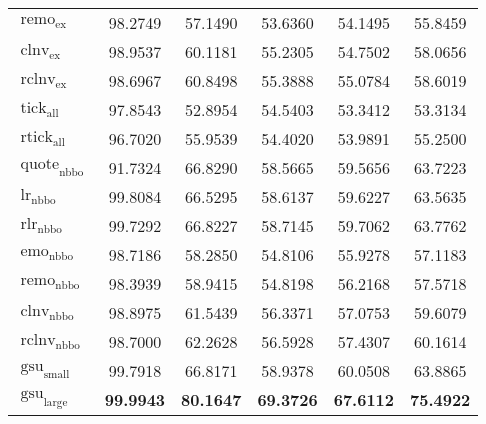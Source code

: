 \begin{table}[ht]
\begin{tabular}{@{}lSSSSS@{}}
        $\operatorname{remo}_{\mathrm{ex}}$    & 98.2749           & 57.1490                            & 53.6360           & 54.1495           & 55.8459           \\
        $\operatorname{clnv}_{\mathrm{ex}}$    & 98.9537           & 60.1181                            & 55.2305           & 54.7502           & 58.0656           \\
        $\operatorname{rclnv}_{\mathrm{ex}}$   & 98.6967           & 60.8498                            & 55.3888           & 55.0784           & 58.6019           \\ \midrule
        $\operatorname{tick}_{\mathrm{all}}$   & 97.8543           & 52.8954                            & 54.5403           & 53.3412           & 53.3134           \\
        $\operatorname{rtick}_{\mathrm{all}}$  & 96.7020           & 55.9539                            & 54.4020           & 53.9891           & 55.2500           \\ \midrule
        $\operatorname{quote}_{\mathrm{nbbo}}$ & 91.7324           & 66.8290                            & 58.5665           & 59.5656           & 63.7223           \\
        $\operatorname{lr}_{\mathrm{nbbo}}$    & 99.8084           & 66.5295                            & 58.6137           & 59.6227           & 63.5635           \\
        $\operatorname{rlr}_{\mathrm{nbbo}}$   & 99.7292           & 66.8227                            & 58.7145           & 59.7062           & 63.7762           \\
        $\operatorname{emo}_{\mathrm{nbbo}}$   & 98.7186           & 58.2850                            & 54.8106           & 55.9278           & 57.1183           \\
        $\operatorname{remo}_{\mathrm{nbbo}}$  & 98.3939           & 58.9415                            & 54.8198           & 56.2168           & 57.5718           \\
        $\operatorname{clnv}_{\mathrm{nbbo}}$  & 98.8975           & 61.5439                            & 56.3371           & 57.0753           & 59.6079           \\
        $\operatorname{rclnv}_{\mathrm{nbbo}}$ & 98.7000           & 62.2628                            & 56.5928           & 57.4307           & 60.1614           \\ \midrule
        $\operatorname{gsu}_{\mathrm{small}}$  & 99.7918           & 66.8171                            & 58.9378           & 60.0508           & 63.8865           \\
        $\operatorname{gsu}_{\mathrm{large}}$  & \bfseries 99.9943 & \bfseries 80.1647                  & \bfseries 69.3726 & \bfseries 67.6112 & \bfseries 75.4922 \\
        \bottomrule
    \end{tabular}
\end{table}

